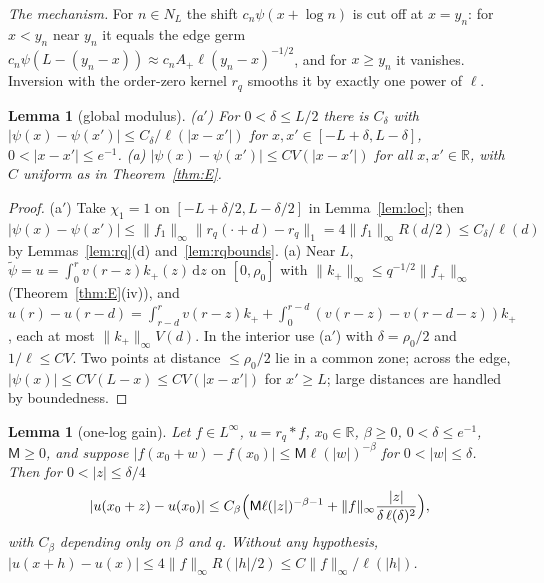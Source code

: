 \documentclass[11pt]{amsart}
\newcommand{\R}{\mathbb{R}}
\newcommand{\dd}{\,\mathrm{d}}
\newtheorem{lemma}[theorem]{Lemma}
\theoremstyle{definition}
\theoremstyle{remark}
\numberwithin{equation}{section}
\begin{document}
\emph{The mechanism.} For $n\in N_L$ the shift $c_n\psi(x+\log n)$ is cut off at $x=y_n$: for $x<y_n$ near $y_n$ it equals the edge germ $c_n\psi(L-(y_n-x))\approx c_nA_+\ell(y_n-x)^{-1/2}$, and for $x\ge y_n$ it vanishes. Inversion with the order-zero kernel $r_q$ smooths it by exactly one power of $\ell$.

\begin{lemma}[global modulus]\label{lem:modulus}
(a$'$) For $0<\delta\le L/2$ there is $C_\delta$ with $|\psi(x)-\psi(x')|\le C_\delta/\ell(|x-x'|)$ for $x,x'\in[-L+\delta,L-\delta]$, $0<|x-x'|\le e^{-1}$. (a) $|\psi(x)-\psi(x')|\le CV(|x-x'|)$ for all $x,x'\in\R$, with $C$ uniform as in Theorem~\ref{thm:E}.
\end{lemma}

\begin{proof}
(a$'$) Take $\chi_1=1$ on $[-L+\delta/2,L-\delta/2]$ in Lemma~\ref{lem:loc}; then $|\psi(x)-\psi(x')|\le\|f_1\|_\infty\|r_q(\cdot+d)-r_q\|_1=4\|f_1\|_\infty R(d/2)\le C_\delta/\ell(d)$ by Lemmas~\ref{lem:rq}(d) and~\ref{lem:rqbounds}. (a) Near $L$, $\tilde\psi=u=\int_0^rv(r-z)k_+(z)\dd z$ on $[0,\rho_0]$ with $\|k_+\|_\infty\le q^{-1/2}\|f_+\|_\infty$ (Theorem~\ref{thm:E}(iv)), and $u(r)-u(r-d)=\int_{r-d}^rv(r-z)k_++\int_0^{r-d}(v(r-z)-v(r-d-z))k_+$, each at most $\|k_+\|_\infty V(d)$. In the interior use (a$'$) with $\delta=\rho_0/2$ and $1/\ell\le CV$. Two points at distance $\le\rho_0/2$ lie in a common zone; across the edge, $|\psi(x)|\le CV(L-x)\le CV(|x-x'|)$ for $x'\ge L$; large distances are handled by boundedness.
\end{proof}

\begin{lemma}[one-log gain]\label{lem:gain}
Let $f\in L^\infty$, $u=r_q*f$, $x_0\in\R$, $\beta\ge0$, $0<\delta\le e^{-1}$, $\mathsf M\ge0$, and suppose $|f(x_0+w)-f(x_0)|\le \mathsf M\ell(|w|)^{-\beta}$ for $0<|w|\le\delta$. Then for $0<|z|\le\delta/4$
\[
|u(x_0+z)-u(x_0)|\le C_\beta\Bigl(\mathsf M\ell(|z|)^{-\beta-1}+\|f\|_\infty\frac{|z|}{\delta\,\ell(\delta)^2}\Bigr),
\]
with $C_\beta$ depending only on $\beta$ and $q$. Without any hypothesis, $|u(x+h)-u(x)|\le4\|f\|_\infty R(|h|/2)\le C\|f\|_\infty/\ell(|h|)$.
\end{lemma}
\end{document}
